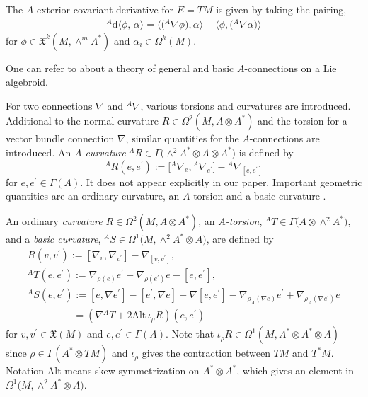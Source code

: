 \documentclass[10pt,a4paper]{amsart}
\numberwithin{equation}{section}
\newcommand{\rhoa}{{\rho_A}}
\newcommand{\bracket}[2]{\langle #1,\,#2\rangle}
\newcommand{\rd}{\mathrm{d}}
\newcommand{\baS}{{{}^A S}}
\newcommand{\anabla}{{{}^A \nabla}}
\begin{document}
The $A$-exterior covariant derivative for $E=TM$ is given by
taking the pairing,
\begin{gather*}
{}^A \rd \bracket{\phi}{\alpha} =
\bigl\langle\bigl(\anabla \phi\bigr),\alpha\bigr\rangle
+ \bigl\langle\phi,\bigl(\anabla \alpha\bigr)\bigr\rangle
\end{gather*}
for $\phi \in \mathfrak{X}^k(M, \wedge^m A^*)$
and $\alpha_i \in \Omega^k(M)$.

One can refer to \cite{AbadCrainic, CrainicFernandes, DufourZung}
about a theory of general and basic $A$-connections on a Lie algebroid.


For two connections $\nabla$ and $\anabla$, various torsions and curvatures are introduced.
Additional to the normal curvature $R \in \Omega^2(M, A \otimes A^*)$ and the torsion for a vector bundle connection $\nabla$,
similar quantities for the $A$-connections are introduced.
An \textit{$A$-curvature} ${}^A R \in \Gamma\bigl(\wedge^2 A^* \otimes A \otimes A^*\bigr)$ is defined by
\[%
{}^A R(e, e^{\prime}) := \bigl[{}^A\nabla_e, {}^A\nabla_{e^{\prime}}\bigr] - {}^A\nabla_{[e, e^{\prime}]}
\]
for $e, e^{\prime} \in \Gamma(A)$. It does not appear explicitly in our paper.
Important geometric quantities are an ordinary curvature, an $A$-torsion
and a basic curvature \cite{Blaom}.
\begin{Definition}
An ordinary \textit{curvature} $R \in \Omega^2(M, A \otimes A^*)$,
an \textit{$A$-torsion}, ${}^A T \in \Gamma\bigl(A \otimes \wedge^2 A^*\bigr)$,
and a \textit{basic curvature}, $\baS \in \Omega^1\bigl(M, \wedge^2 A^* \otimes A\bigr)$, are defined by
\begin{gather}%
R(v, v^{\prime}) := [\nabla_v, \nabla_{v^{\prime}}] - \nabla_{[v, v^{\prime}]},\nonumber
\\
{}^A T(e, e^{\prime}) := \nabla_{\rho(e)} e^{\prime} - \nabla_{\rho(e^{\prime})} e
- [e, e^{\prime}],
\label{Etorsion}
\\
\baS(e, e^{\prime}) :=
[e, \nabla e^{\prime}] - [e^{\prime}, \nabla e]
- \nabla[e, e^{\prime}]
- \nabla_{\rhoa(\nabla e)} e^{\prime} + \nabla_{\rhoa(\nabla e^{\prime})} e\nonumber\\
\phantom{\baS(e, e^{\prime})}{}= (\nabla {}^A T + 2 \mathrm{Alt} \, \iota_\rho R)(e, e^{\prime})
\nonumber
\end{gather}
for $v, v^{\prime} \in \mathfrak{X}(M)$ and $e, e^{\prime} \in \Gamma(A)$.
Note that $\iota_\rho R \in \Omega^1(M, A^* \otimes A^* \otimes A)$ since
$\rho \in \Gamma(A^* \otimes TM)$ and $\iota_\rho$ gives the contraction
between $TM$ and $T^*M$. Notation $\mathrm{Alt}$ means skew symmetrization on $A^* \otimes A^*$, which gives an element in $\Omega^1\bigl(M, \wedge^2 A^* \otimes A\bigr)$.
\end{Definition}
\end{document}
